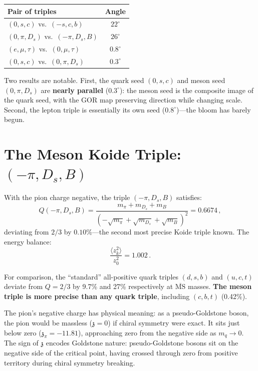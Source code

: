 \documentclass[12pt,a4paper]{article}
\newcommand{\zch}{\mathfrak{z}}
\begin{document}
\begin{center}
\begin{tabular}{lc}
\toprule
Pair of triples & Angle \\
\midrule
$(0,s,c)$ vs.\ $(-s,c,b)$ & $22^\circ$ \\
$(0,\pi,D_s)$ vs.\ $(-\pi,D_s,B)$ & $26^\circ$ \\
$(e,\mu,\tau)$ vs.\ $(0,\mu,\tau)$ & $0.8^\circ$ \\
$(0,s,c)$ vs.\ $(0,\pi,D_s)$ & $0.3^\circ$ \\
\bottomrule
\end{tabular}
\end{center}

Two results are notable. First, the quark seed $(0,s,c)$ and meson 
seed $(0,\pi,D_s)$ are \textbf{nearly parallel} ($0.3^\circ$): the 
meson seed is the composite image of the quark seed, with the GOR 
map preserving direction while changing scale. Second, the lepton 
triple is essentially its own seed ($0.8^\circ$)---the bloom has 
barely begun.


\section{The Meson Koide Triple: $(-\pi, D_s, B)$}
\label{sec:mesonkoide}

With the pion charge negative, the triple $(-\pi, D_s, B)$ satisfies:
\begin{equation}
Q(-\pi, D_s, B) = 
\frac{m_\pi + m_{D_s} + m_B}{(-\sqrt{m_\pi} + \sqrt{m_{D_s}} + \sqrt{m_B})^2}
= 0.6674\,,
\end{equation}
deviating from $2/3$ by $0.10\%$---the second most precise Koide 
triple known. The energy balance:
\begin{equation}
\frac{\langle z_k^2\rangle}{z_0^2} = 1.002\,.
\end{equation}

For comparison, the ``standard'' all-positive quark triples $(d,s,b)$ 
and $(u,c,t)$ deviate from $Q = 2/3$ by 9.7\% and 27\% respectively 
at $\overline{\text{MS}}$ masses. \textbf{The meson triple is more
precise than any quark triple}, including $(c,b,t)$ (0.42\%).

The pion's negative charge has physical meaning: as a pseudo-Goldstone
boson, the pion would be massless ($\zch = 0$) if chiral symmetry were
exact. It sits just below zero ($\zch_\pi = -11.81$), approaching zero
from the negative side as $m_q \to 0$. The sign of $\zch$ encodes
Goldstone nature: pseudo-Goldstone bosons sit on the negative side
of the critical point, having crossed through zero from positive
territory during chiral symmetry breaking.
\end{document}
